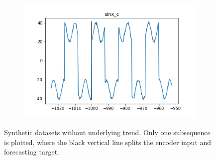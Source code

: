 \begin{figure}[ht]
\begin{subfigure}{0.45\textwidth}
    \end{subfigure}
    \begin{subfigure}{0.45\textwidth}
        \includegraphics[width=\textwidth]{img/data_sinx_c.png}
    \end{subfigure}
    \caption{Synthetic datasets without underlying trend. 
    Only one subsequence is plotted, where the black vertical line splits the encoder input and forecasting target.}
\end{figure}
\clearpage


